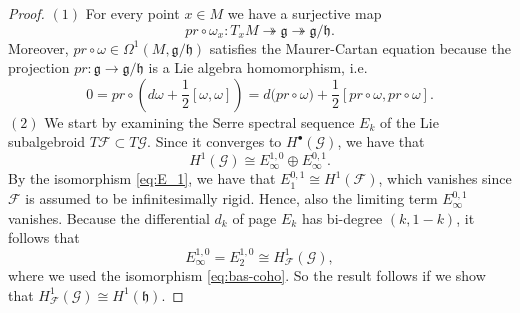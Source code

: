 \documentclass[11pt, letterpaper, oneside,reqno]{amsart}
\theoremstyle{plain}
\theoremstyle{underline}
\theoremstyle{definition}
\theoremstyle{remark}
\begin{document}
	\begin{proof}
		$(1)$ For every point $x\in M$ we have a surjective map
		\[
		pr\circ\omega_x:T_{x}M\twoheadrightarrow\mathfrak{g}\twoheadrightarrow\mathfrak{g}/\mathfrak{h}.
		\]
		Moreover, $pr\circ\omega\in\Omega^{1}(M,\mathfrak{g}/\mathfrak{h})$ satisfies the Maurer-Cartan equation because the projection $pr:\mathfrak{g}\rightarrow \mathfrak{g}/\mathfrak{h}$ is a Lie algebra homomorphism, i.e.
		\[
		0=pr\circ\left(d\omega+\frac{1}{2}[\omega,\omega]\right)=d\big(pr\circ\omega\big)+\frac{1}{2}[pr\circ\omega,pr\circ\omega].
		\]
		$(2)$ We start by examining the Serre spectral sequence $E_k$ of the Lie subalgebroid $T\mathcal{F}\subset T\mathcal{G}$. Since it converges to $H^{\bullet}(\mathcal{G})$, we have that
		\[
		H^{1}(\mathcal{G})\cong E_{\infty}^{1,0}\oplus E_{\infty}^{0,1}.
		\]
		By the isomorphism \eqref{eq:E_1}, we have that $E_1^{0,1}\cong H^{1}(\mathcal{F})$, which vanishes since $\mathcal{F}$ is assumed to be infinitesimally rigid. Hence, also the limiting term $E_{\infty}^{0,1}$ vanishes. Because the differential $d_k$ of page $E_k$ has bi-degree $(k,1-k)$, it follows that
		\[
		E_{\infty}^{1,0}=E_2^{1,0}\cong H^{1}_{\mathcal{F}}(\mathcal{G}),
		\]
		where we used the isomorphism \eqref{eq:bas-coho}. So the result follows if we show that $H^{1}_{\mathcal{F}}(\mathcal{G})\cong H^{1}(\mathfrak{h})$.
		

\end{proof}
\end{document}
